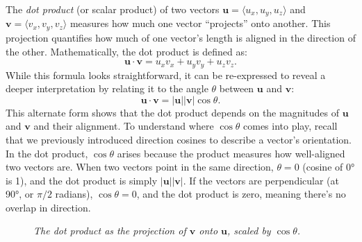 The \textit{dot product} (or scalar product) of two vectors \( \mathbf{u} = \langle u_x, u_y, u_z \rangle \) and \( \mathbf{v} = \langle v_x, v_y, v_z \rangle \) measures how much one vector “projects” onto another. This projection quantifies how much of one vector’s length is aligned in the direction of the other. Mathematically, the dot product is defined as:
\[
\mathbf{u} \cdot \mathbf{v} = u_x v_x + u_y v_y + u_z v_z.
\]
While this formula looks straightforward, it can be re-expressed to reveal a deeper interpretation by relating it to the angle \( \theta \) between \( \mathbf{u} \) and \( \mathbf{v} \):
\[
\mathbf{u} \cdot \mathbf{v} = |\mathbf{u}| |\mathbf{v}| \cos \theta.
\]
This alternate form shows that the dot product depends on the magnitudes of \( \mathbf{u} \) and \( \mathbf{v} \) and their alignment. To understand where \( \cos \theta \) comes into play, recall that we previously introduced direction cosines to describe a vector’s orientation. In the dot product, \( \cos \theta \) arises because the product measures how well-aligned two vectors are. When two vectors point in the same direction, \( \theta = 0 \) (cosine of 0° is 1), and the dot product is simply \( |\mathbf{u}| |\mathbf{v}| \). If the vectors are perpendicular (at 90°, or \( \pi/2 \) radians), \( \cos \theta = 0 \), and the dot product is zero, meaning there’s no overlap in direction.

\begin{figure}[H]
    \centering
    \caption{\textit{The dot product as the projection of \( \mathbf{v} \) onto \( \mathbf{u} \), scaled by \( \cos \theta \).}}
    \label{fig:dot_product_projection}
\end{figure}

